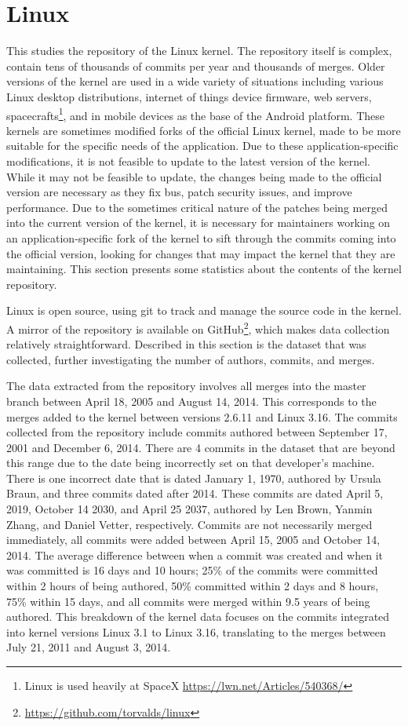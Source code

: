 \section{Linux}\label{sec:linux}

This \paper{} studies the repository of the Linux kernel. The repository
itself is complex, contain tens of thousands of commits per year and
thousands of merges. Older versions of the kernel are used in a wide
variety of situations including various Linux desktop distributions,
internet of things device firmware, web servers,
spacecrafts\footnote{Linux is used heavily at SpaceX
  \url{https://lwn.net/Articles/540368/}}, and in mobile devices as the
base of the Android platform. These kernels are sometimes modified forks
of the official Linux kernel, made to be more suitable for the specific
needs of the application. Due to these application-specific
modifications, it is not feasible to update to the latest version of the
kernel. While it may not be feasible to update, the changes being made
to the official version are necessary as they fix bus, patch security
issues, and improve performance. Due to the sometimes critical nature of
the patches being merged into the current version of the kernel, it is
necessary for maintainers working on an application-specific fork of the
kernel to sift through the commits coming into the official version,
looking for changes that may impact the kernel that they are
maintaining. This section presents some statistics about the contents of
the kernel repository.

Linux is open source, using git to track and manage the source code in
the kernel. A mirror of the repository is available on
GitHub\footnote{\url{https://github.com/torvalds/linux}}, which makes
data collection relatively straightforward. Described in this section is
the dataset that was collected, further investigating the number of
authors, commits, and merges.

The data extracted from the repository involves all merges into the
master branch between April 18, 2005 and August 14, 2014. This
corresponds to the merges added to the kernel between versions 2.6.11
and Linux 3.16. The commits collected from the repository include
commits authored between September 17, 2001 and December 6, 2014. There
are 4 commits in the dataset that are beyond this range due to the date
being incorrectly set on that developer's machine. There is one
incorrect date that is dated January 1, 1970, authored by Ursula Braun,
and three commits dated after 2014. These commits are dated April 5,
2019, October 14 2030, and April 25 2037, authored by Len Brown, Yanmin
Zhang, and Daniel Vetter, respectively. Commits are not necessarily
merged immediately, all commits were added between April 15, 2005 and
October 14, 2014. The average difference between when a commit was
created and when it was committed is 16 days and 10 hours; 25\% of the
commits were committed within 2 hours of being authored, 50\% committed
within 2 days and 8 hours, 75\% within 15 days, and all commits were
merged within 9.5 years of being authored. This breakdown of the kernel
data focuses on the commits integrated into kernel versions Linux 3.1 to
Linux 3.16, translating to the merges between July 21, 2011 and August
3, 2014.

